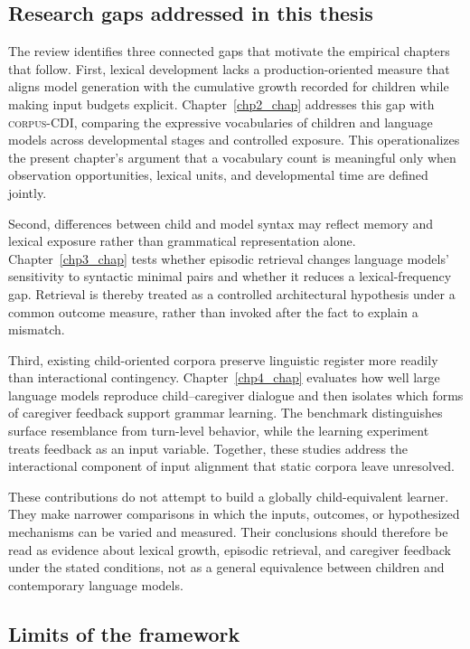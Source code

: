 \subsection{Research gaps addressed in this thesis}
\label{sec:litreview:thesis-gaps}

The review identifies three connected gaps that motivate the empirical chapters that follow. First, lexical development lacks a production-oriented measure that aligns model generation with the cumulative growth recorded for children while making input budgets explicit. Chapter~\ref{chp2_chap} addresses this gap with \textsc{corpus-CDI}, comparing the expressive vocabularies of children and language models across developmental stages and controlled exposure. This operationalizes the present chapter's argument that a vocabulary count is meaningful only when observation opportunities, lexical units, and developmental time are defined jointly.

Second, differences between child and model syntax may reflect memory and lexical exposure rather than grammatical representation alone. Chapter~\ref{chp3_chap} tests whether episodic retrieval changes language models' sensitivity to syntactic minimal pairs and whether it reduces a lexical-frequency gap. Retrieval is thereby treated as a controlled architectural hypothesis under a common outcome measure, rather than invoked after the fact to explain a mismatch.

Third, existing child-oriented corpora preserve linguistic register more readily than interactional contingency. Chapter~\ref{chp4_chap} evaluates how well large language models reproduce child--caregiver dialogue and then isolates which forms of caregiver feedback support grammar learning. The benchmark distinguishes surface resemblance from turn-level behavior, while the learning experiment treats feedback as an input variable. Together, these studies address the interactional component of input alignment that static corpora leave unresolved.

These contributions do not attempt to build a globally child-equivalent learner. They make narrower comparisons in which the inputs, outcomes, or hypothesized mechanisms can be varied and measured. Their conclusions should therefore be read as evidence about lexical growth, episodic retrieval, and caregiver feedback under the stated conditions, not as a general equivalence between children and contemporary language models.

\subsection{Limits of the framework}
\label{sec:litreview:limits}

